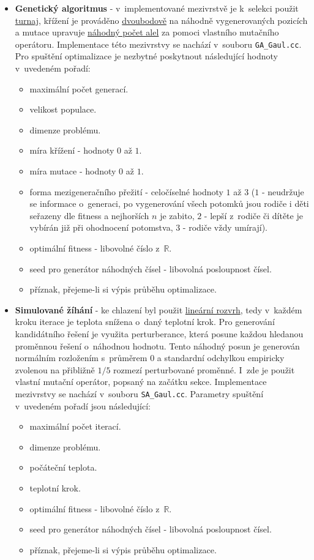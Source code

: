 \begin{itemize}
\item \textbf{Genetický algoritmus} -
v~implementované mezivrstvě je k~selekci použit \underline{turnaj}, křížení je prováděno \underline{dvoubodově} na náhodně vygenerovaných pozicích a mutace upravuje \underline{náhodný počet alel} za pomoci vlastního mutačního operátoru. Implementace této mezivrstvy se nachází v~souboru \texttt{GA\_Gaul.cc}. Pro spuštění optimalizace je nezbytné poskytnout následující hodnoty v~uvedeném pořadí:
\begin{itemize}
    \item maximální počet generací.
    \item velikost populace.
    \item dimenze problému.
    \item míra křížení - hodnoty $0$ až $1$.
    \item míra mutace - hodnoty $0$ až $1$.
    \item forma mezigeneračního přežití - celočíselné hodnoty $1$ až $3$ ($1$ - neudržuje se informace o~generaci, po vygenerování všech potomků jsou rodiče i děti seřazeny dle fitness a nejhorších $n$ je zabito, $2$ - lepší z~rodiče či dítěte je vybírán již při ohodnocení potomstva, $3$ - rodiče vždy umírají).
    \item optimální fitness - libovolné číslo z~$\mathbb{R}$.
    \item seed pro generátor náhodných čísel - libovolná posloupnost čísel.
    \item příznak, přejeme-li si výpis průběhu optimalizace.
\end{itemize}

\item \textbf{Simulované žíhání} - ke chlazení byl použit \underline{lineární rozvrh}, tedy v~každém kroku iterace je teplota snížena o~daný teplotní krok. Pro generování kandidátního řešení je využita perturberance, která posune každou hledanou proměnnou řešení o~náhodnou hodnotu. Tento náhodný posun je generován normálním rozložením s~průměrem $0$ a standardní odchylkou empiricky zvolenou na přibližně \textbf{$1/5$} rozmezí perturbované proměnné. I~zde je použit vlastní mutační operátor, popsaný na začátku sekce. Implementace mezivrstvy se nachází v~souboru \texttt{SA\_Gaul.cc}. Parametry spuštění v~uvedeném pořadí jsou následující:
\begin{itemize}
    \item maximální počet iterací.
    \item dimenze problému.
    \item počáteční teplota.
    \item teplotní krok.
    \item optimální fitness - libovolné číslo z~$\mathbb{R}$.
    \item seed pro generátor náhodných čísel - libovolná posloupnost čísel.
    \item příznak, přejeme-li si výpis průběhu optimalizace.
\end{itemize}


\end{itemize}
